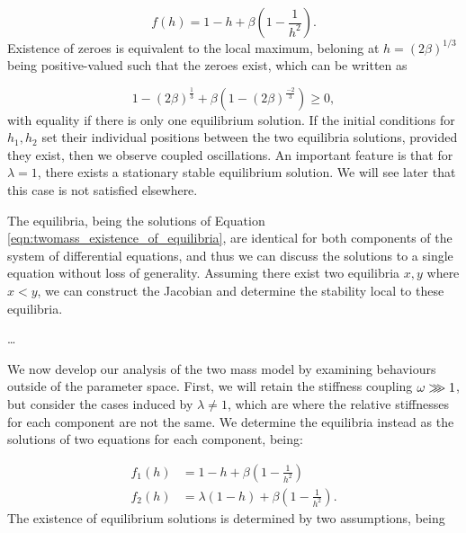 \documentclass{article}
\begin{document}
\begin{equation}
    f(h) = 1 - h + \beta \left( 1 - \frac{1}{h^2} \right).
    \label{eqn:twomass_existence_of_equilibria}
\end{equation}
Existence of zeroes is equivalent to the local maximum, beloning at \(h = \left( 2\beta \right)^{1/3}\) being positive-valued such that the zeroes exist,
which can be written as

\begin{equation}
    1 - \left(2\beta\right)^\frac{1}{3} + \beta\left( 1 - (2\beta)^\frac{-2}{3} \right) \ge 0,
    \label{eqn:twomass_zeroes_equal_stiffness}
\end{equation}
with equality if there is only one equilibrium solution.
If the initial conditions for \(h_1, h_2\) set their individual positions between the two equilibria solutions,
provided they exist,
then we observe coupled oscillations.
An important feature is that for \(\lambda = 1\), there exists a stationary stable equilibrium solution.
We will see later that this case is not satisfied elsewhere.

The equilibria, being the solutions of Equation \ref{eqn:twomass_existence_of_equilibria}, are identical for both components of the system of differential equations,
and thus we can discuss the solutions to a single equation without loss of generality.
Assuming there exist two equilibria \(x,y\) where \(x < y\), 
we can construct the Jacobian and determine the stability local to these equilibria.

\dots

We now develop our analysis of the two mass model by examining behaviours outside of the parameter space.
First, we will retain the stiffness coupling \(\omega \gggtr 1\),
but consider the cases induced by \(\lambda \ne 1\), which are where the relative stiffnesses for each component are not the same.
We determine the equilibria instead as the solutions of two equations for each component, being:

\begin{equation}
    \begin{aligned}
        f_1(h) &= 1 - h + \beta\left( 1-\frac{1}{h^2} \right) \\
        f_2(h) &= \lambda(1-h) + \beta\left( 1-\frac{1}{h^2} \right).
    \end{aligned}
\end{equation}
The existence of equilibrium solutions is determined by two assumptions, being
\end{document}
